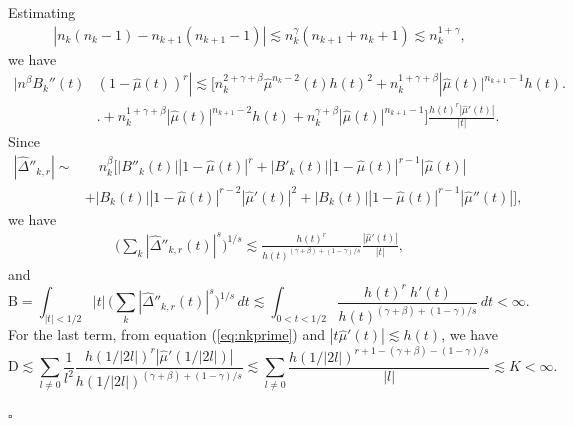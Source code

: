 \documentclass[11pt]{amsart}
\theoremstyle{definition}
\theoremstyle{remark}
\begin{document}
Estimating
\begin{align*}
|n_k(n_k-1)-n_{k+1}(n_{k+1}-1)| 
\lesssim  n_k^{\gamma}(n_{k+1}+n_k+1)  
\lesssim n_k^{1+\gamma},
\end{align*}
we have
\begin{align*}
|n^{\beta} B_k''(t)&(1-\hat\mu(t))^r| \lesssim  \Big[   n_k^{2+\gamma+\beta}  \hat\mu^{n_k-2}(t) h(t)^2 
     + n_k^{1+\gamma+\beta} |\hat\mu(t)|^{n_{k+1}-1}  h(t)  \Big. \\
 & \Big. + n_{k}^{1+\gamma+\beta} |\hat\mu(t)|^{n_{k+1}-2}  h(t) 
 +n_{k}^{\gamma+\beta} |\hat\mu(t)|^{n_{k+1}-1}  \Big] \frac{h(t)^r |\hat\mu'(t)|}{|t|}.
\end{align*}
  Since 
  \begin{align*}  
  |\hat\Delta''_{k,r}| \sim & \quad n_k^{\beta} \Big[   |B''_k(t)| |1-\hat\mu(t)|^r + |B'_k(t)| |1-\hat\mu(t)|^{r-1} |\hat\mu(t)| \\
  & +
  |B_k(t)|  |1-\hat\mu(t)|^{r-2} |\hat\mu'(t)|^2 + |B_k(t)|  |1-\hat\mu(t)|^{r-1} |\hat\mu''(t)|
 \Big],
  \end{align*}
  we have
\begin{align}
\Big(   \sum_k   |\hat\Delta''_{k,r}(t)|^s    \Big)^{1/s} 
  \lesssim    \frac{h(t)^r}{h(t)^{(\gamma+\beta)+(1-\gamma)/s } }   \frac{|\hat\mu'(t)|} {|t|}, \label{eq:nk2primev2}%
\end{align}
and
\begin{equation*}
\mbox{B} =  \int_{|t|<1/2} |t|\,  \Big( \sum_k  |\hat\Delta''_{k,r}(t)|^s  \Big)^{1/s} \, dt 
  \lesssim   \int_{0<t<1/2} 
\frac {h(t)^r \ h'(t)}{h(t)^{(\gamma +\beta)+(1-\gamma)/s }}\, dt<\infty.
\end{equation*}
%
%
For the last term, from equation (\ref{eq:nkprime}) and $|t\hat\mu'(t)|\lesssim h(t)$,  we have
\[
\mbox{D} \lesssim        \sum_{l\neq0} \frac 1{l^2} \frac {h(1/|2l|)^r |\hat \mu'(1/|2l|)|}{h(1/|2l|)^{(\gamma+\beta)+(1-\gamma)/s }} 
 \lesssim \sum_{l\neq 0}  \frac {h(1/|2l|)^{r +1 -(\gamma+\beta)-(1-\gamma)/s}}{|l|} \lesssim K
<\infty. 
\]
  
  
  

\hfill$\square$
\end{document}
